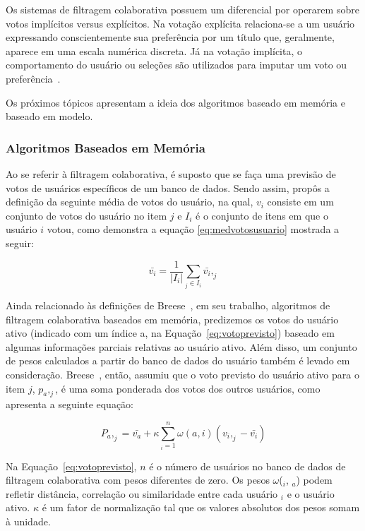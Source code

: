 Os sistemas de filtragem colaborativa possuem um diferencial por operarem sobre votos implícitos versus explícitos. Na votação explícita relaciona-se a um usuário expressando conscientemente sua preferência por um título que, geralmente, aparece em uma escala numérica discreta. Já na votação implícita, o comportamento do usuário ou seleções são utilizados para imputar um voto ou preferência~\cite{breese1998empirical}.

Os próximos tópicos apresentam a ideia dos algoritmos baseado em memória e baseado em modelo. 

\subsubsection{Algoritmos Baseados em Memória}

Ao se referir à filtragem colaborativa, é suposto que se faça uma previsão de votos de usuários específicos de um banco de dados. Sendo assim, \cite{breese1998empirical} propôs a definição da seguinte média de votos do usuário, na qual, $v_i$ consiste em um conjunto de votos do usuário no item $j$ e $I_i$ é o conjunto de itens em que o usuário $i$ votou, como demonstra a equação \ref{eq:medvotosusuario} mostrada a seguir:

\begin{equation}
    \label{eq:medvotosusuario}
    \bar{v_i} = \frac{1}{\left | I_i \right |} \sum_{_j\in I_i}^{ }\bar{v_i},_j
\end{equation}

Ainda relacionado às definições de Breese~\cite{breese1998empirical}, em seu trabalho, algoritmos de filtragem colaborativa baseados em memória, predizemos os votos do usuário ativo (indicado com um índice a, na Equação~\ref{eq:votoprevisto}) baseado em algumas informações parciais relativas ao usuário ativo. Além disso, um conjunto de pesos calculados a partir do banco de dados do usuário também é levado em consideração. Breese~\cite{breese1998empirical}, então, assumiu que o voto previsto do usuário ativo para o item $j$, $p_a,_j$, é uma soma ponderada dos votos dos outros usuários, como apresenta a seguinte equação:

\begin{equation}
    \label{eq:votoprevisto}
    {P_a,_j} = \bar{v_a} + \kappa \sum_{_i=1}^{n} \omega (a,i)(v_i,_j - \bar{v_i})
\end{equation}

Na Equação~\ref{eq:votoprevisto}, $n$ é o número de usuários no banco de dados de filtragem colaborativa com pesos diferentes de zero. Os pesos $\omega$($_i$, $_a$) podem refletir distância, correlação ou similaridade entre cada usuário $_i$ e o usuário ativo. $\kappa$ é um fator de normalização tal que os valores absolutos dos pesos somam à unidade.

